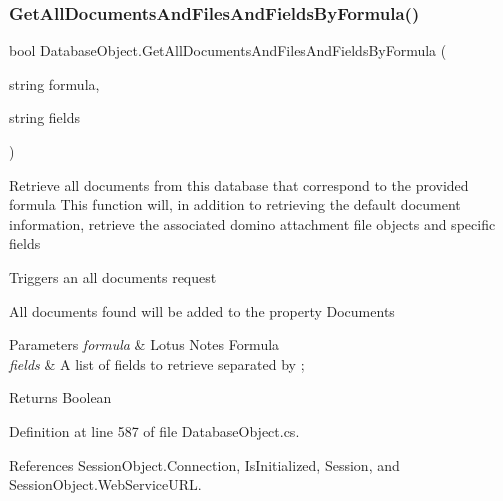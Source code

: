 \subsubsection{\texorpdfstring{Get\+All\+Documents\+And\+Files\+And\+Fields\+By\+Formula()}{GetAllDocumentsAndFilesAndFieldsByFormula()}\hspace{0.1cm}{\footnotesize\ttfamily [2/2]}}
{\footnotesize\ttfamily bool Database\+Object.\+Get\+All\+Documents\+And\+Files\+And\+Fields\+By\+Formula (\begin{DoxyParamCaption}\item[{string}]{formula,  }\item[{string}]{fields }\end{DoxyParamCaption})}



Retrieve all documents from this database that correspond to the provided formula This function will, in addition to retrieving the default document information, retrieve the associated domino attachment file objects and specific fields 

Triggers an all documents request

All documents found will be added to the property \textquotesingle{}Documents\textquotesingle{}


\begin{DoxyParams}{Parameters}
{\em formula} & Lotus Notes Formula\\
\hline
{\em fields} & A list of fields to retrieve separated by ; \\
\hline
\end{DoxyParams}
\begin{DoxyReturn}{Returns}
Boolean
\end{DoxyReturn}


Definition at line 587 of file Database\+Object.\+cs.



References Session\+Object.\+Connection, Is\+Initialized, Session, and Session\+Object.\+Web\+Service\+U\+RL.


